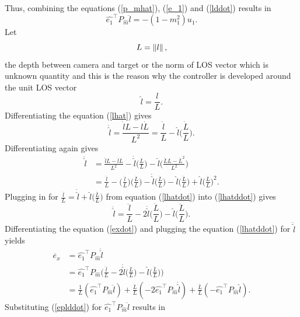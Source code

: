 Thus, combining the equations (\ref{p_mhat}), (\ref{e_1}) and (\ref{lddot})
results in 
\begin{equation}
\hat{e_1}^{\top}P_{\hat{m}}\ddot{l}=-(1-m_1^2)u_1.
\label{eplddot}
\end{equation}
Let
\begin{equation}
L=\left\lVert l\right\rVert,
\end{equation} the depth between camera and target or the norm of LOS vector which is unknown quantity and this is the reason why the controller is developed around the unit LOS vector 
\begin{equation}
\hat{l}=\frac{l}{L}.
\label{lhat}
\end{equation}
Differentiating the equation (\ref{lhat}) gives
\begin{equation}
\dot{\hat{l}}=\frac{\dot{l}L-l\dot{L}}{L^2}=\frac{\dot{l}}{L}-\hat{l}\bigg(\frac{\dot{L}}{L}\bigg).
\label{lhatdot}
\end{equation}
Differentiating again gives
\begin{align}
\ddot{\hat{l}}&=\frac{\ddot{l}L-\dot{l}\dot{L}}{L^2}-\dot{\hat{l}}\bigg(\frac{\dot{L}}{L}\bigg)-\hat{l}\bigg(\frac{\ddot{L}L-\dot{L}^2}{L^2}\bigg)
\\&=\frac{\ddot{l}}{L}-\bigg(\frac{\dot{l}}{L}\bigg)\bigg(\frac{\dot{L}}{L}\bigg)-\dot{\hat{l}}\bigg(\frac{\dot{L}}{L}\bigg)-\hat{l}\bigg(\frac{\ddot{L}}{L}\bigg)+\hat{l}\bigg(\frac{\dot{L}}{L}\bigg)^2.
\label{lhatddot}
\end{align}
Plugging in for $\frac{\dot{l}}{L}=\dot{\hat{l}}+\hat{l}\bigg(\frac{\dot{L}}{L}\bigg)$ from equation (\ref{lhatdot}) into (\ref{lhatddot}) gives
\begin{equation}
\ddot{\hat{l}}=\frac{\ddot{l}}{L}-2\dot{\hat{l}}\bigg(\frac{\dot{L}}{L}\bigg)-\hat{l}\bigg(\frac{\ddot{L}}{L}\bigg).
\label{lhatddot}
\end{equation}
Differentiating the equation (\ref{exdot}) and plugging the equation (\ref{lhatddot}) for $\ddot{\hat{l}}$ yields
\begin{align}
\ddot{e_x}&=\hat{e_1}^{\top}P_{\hat{m}}\ddot{\hat{l}}
\\&=\hat{e_1}^{\top}P_{\hat{m}}\bigg(\frac{\ddot{l}}{L}-2\dot{\hat{l}}\bigg(\frac{\dot{L}}{L}\bigg)-\hat{l}\bigg(\frac{\ddot{L}}{L}\bigg)\bigg)
\\&=\frac{1}{L}(\hat{e_1}^{\top}P_{\hat{m}}\ddot{l})+\frac{\dot{L}}{L}(-2\hat{e_1}^{\top}P_{\hat{m}}\dot{\hat{l}})+\frac{\ddot{L}}{L}(-\hat{e_1}^{\top}P_{\hat{m}}\hat{l}).
\end{align}
Substituting (\ref{eplddot}) for $\hat{e_1}^{\top}P_{\hat{m}}\ddot{l}$ results in  
